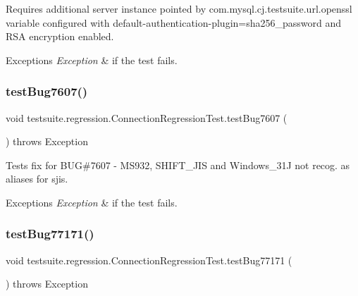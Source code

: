 Requires additional server instance pointed by com.\+mysql.\+cj.\+testsuite.\+url.\+openssl variable configured with default-\/authentication-\/plugin=sha256\+\_\+password and R\+SA encryption enabled.


\begin{DoxyExceptions}{Exceptions}
{\em Exception} & if the test fails. \\
\hline
\end{DoxyExceptions}
\mbox{\label{classtestsuite_1_1regression_1_1_connection_regression_test_a546e675781e810a5d2ba2f12d41a3f24}} 
\subsubsection{\texorpdfstring{test\+Bug7607()}{testBug7607()}}
{\footnotesize\ttfamily void testsuite.\+regression.\+Connection\+Regression\+Test.\+test\+Bug7607 (\begin{DoxyParamCaption}{ }\end{DoxyParamCaption}) throws Exception}

Tests fix for B\+UG\#7607 -\/ M\+S932, S\+H\+I\+F\+T\+\_\+\+J\+IS and Windows\+\_\+31J not recog. as aliases for sjis.


\begin{DoxyExceptions}{Exceptions}
{\em Exception} & if the test fails. \\
\hline
\end{DoxyExceptions}
\mbox{\label{classtestsuite_1_1regression_1_1_connection_regression_test_adca05ee2426734f0d6b5bdf2c98ceeef}} 
\subsubsection{\texorpdfstring{test\+Bug77171()}{testBug77171()}}
{\footnotesize\ttfamily void testsuite.\+regression.\+Connection\+Regression\+Test.\+test\+Bug77171 (\begin{DoxyParamCaption}{ }\end{DoxyParamCaption}) throws Exception}

